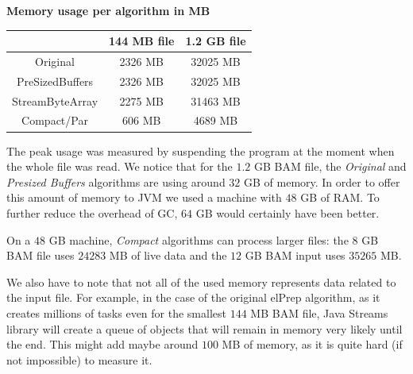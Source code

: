 \documentclass[a4paper,twoside]{article}
\begin{document}


\begin{small}
\begin{center}
\textbf{Memory usage per algorithm in MB} \\
	\begin{tabular}{|c|c|c|}
		\hline			  	& 144 MB file		& 1.2 GB file		\\ \hline
		Original			& 2326 MB			& 32025 MB			\\ \hline
		PreSizedBuffers		& 2326 MB			& 32025 MB			\\ \hline
		StreamByteArray 	& 2275 MB			& 31463 MB			\\ \hline
		Compact/Par			& 606 MB			& 4689 MB			\\ \hline
	\end{tabular}
\end{center}
\end{small}

The peak usage was measured by suspending the program at the moment when the whole file was read.
We notice that for the $1.2$ GB BAM file, the {\it Original} and {\it Presized Buffers} algorithms are using around $32$ GB of memory. In order to offer this amount of memory to JVM we used a machine with $48$ GB of RAM. To further reduce the overhead of GC, $64$ GB would certainly have been better.


On a $48$ GB machine, {\it Compact} algorithms can process larger files: the $8$ GB BAM file uses $24283$ MB of live data and the $12$ GB BAM input uses $35 265$ MB.


We also have to note that not all of the used memory represents data related to the input file.
For example, in the case of the original elPrep algorithm, as it creates millions of tasks even for the smallest $144$ MB BAM file, Java Streams library will create a queue of objects that will remain in memory very likely until the end. This might add maybe around $100$ MB of memory, as it is quite hard (if not impossible) to measure it.
\end{document}
